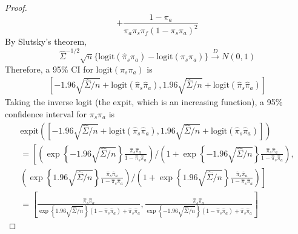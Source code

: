 \documentclass[letterpaper, 12pt]{article}
\begin{document}
\begin{enumerate}[(i)]
\begin{proof}
\[+
\frac{1 - \pi_a}{\pi_a\pi_s\pi_f(1-\pi_s\pi_a)^2}
\]
By Slutsky's theorem, 
\[
\hat{\Sigma}^{-1/2}
\sqrt{n} \{
\text{logit}(\hat{\pi}_s\hat{\pi}_a)
-
\text{logit}(\pi_s\pi_a)
\}
\xrightarrow{D}
N(0, 1)
\]
Therefore, a 95\% CI for 
$\text{logit}(\pi_s\pi_a)$
is
\begin{align*}
\left[
-1.96 \sqrt{\hat{\Sigma}/n} + \text{logit}(\hat{\pi}_s\hat{\pi}_a),  1.96 \sqrt{\hat{\Sigma}/n} + \text{logit}(\hat{\pi}_s\hat{\pi}_a)
\right]
\end{align*}
Taking the inverse logit (the expit, which is an increasing function), a 95\% confidence interval for $\pi_s\pi_a$ is
\begin{align*}
\text{expit}\left(
\left[
-1.96 \sqrt{\hat{\Sigma}/n} + \text{logit}(\hat{\pi}_s\hat{\pi}_a), 
1.96 \sqrt{\hat{\Sigma}/n} + \text{logit}(\hat{\pi}_s\hat{\pi}_a)
\right]
\right)
\\
=
\left[
\left(
\exp\left\{ 
-1.96 \sqrt{\hat{\Sigma}/n}
\right\}
\frac{\hat{\pi}_s\hat{\pi}_a}{1-\hat{\pi}_s\hat{\pi}_a}
\right)/
\left(
1+\exp\left\{ 
-1.96 \sqrt{\hat{\Sigma}/n}
\right\}
\frac{\hat{\pi}_s\hat{\pi}_a}{1-\hat{\pi}_s\hat{\pi}_a}
\right),\right.
\\
\left.
\left(
\exp\left\{ 
1.96 \sqrt{\hat{\Sigma}/n}
\right\}
\frac{\hat{\pi}_s\hat{\pi}_a}{1-\hat{\pi}_s\hat{\pi}_a}
\right)/
\left(
1+\exp\left\{ 
1.96 \sqrt{\hat{\Sigma}/n}
\right\}
\frac{\hat{\pi}_s\hat{\pi}_a}{1-\hat{\pi}_s\hat{\pi}_a}
\right)
\right]
\\
=
\left[
\frac{
\hat{\pi}_s\hat{\pi}_a
}
{
\exp\left\{ 
1.96 \sqrt{\hat{\Sigma}/n}
\right\} (1 - \hat{\pi}_s\hat{\pi}_a) + \hat{\pi}_s\hat{\pi}_a
},
\frac{
\hat{\pi}_s\hat{\pi}_a
}
{
\exp\left\{ 
-1.96 \sqrt{\hat{\Sigma}/n}
\right\} (1 - \hat{\pi}_s\hat{\pi}_a) + \hat{\pi}_s\hat{\pi}_a
}
\right]
\end{align*}
\end{proof}

\end{enumerate}
\end{document}
